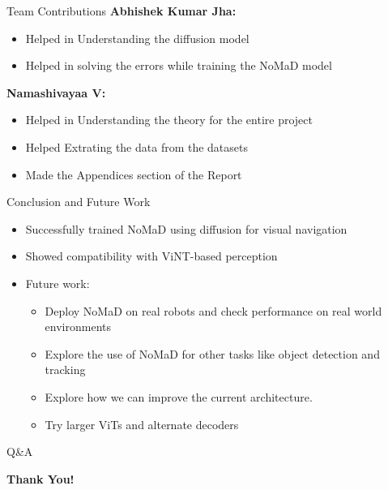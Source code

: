 \documentclass{beamer}
\begin{document}
\begin{frame}{Team Contributions}
    \textbf{Abhishek Kumar Jha:} \\
    \begin{itemize}
        \item Helped in Understanding the diffusion model
        \item Helped in solving the errors while training the NoMaD model
    \end{itemize}
    \textbf{Namashivayaa V:} \\
    \begin{itemize}
        \item Helped in Understanding the theory for the entire project
        \item Helped Extrating the data from the datasets
        \item Made the Appendices section of the Report
    \end{itemize}
\end{frame}

\begin{frame}{Conclusion and Future Work}
\begin{itemize}
    \item Successfully trained NoMaD using diffusion for visual navigation
    \item Showed compatibility with ViNT-based perception
    \item Future work:
    \begin{itemize}
        \item Deploy NoMaD on real robots and check performance on real world environments
        \item Explore the use of NoMaD for other tasks like object detection and tracking
        \item Explore how we can improve the current architecture.
        \item Try larger ViTs and alternate decoders
    \end{itemize}
\end{itemize}
\end{frame}

\begin{frame}{Q\&A}
    \begin{center}
        \Huge{\textbf{Thank You!}}\\
    \end{center}
\end{frame}
\end{document}
